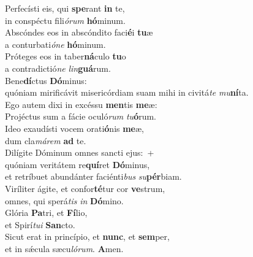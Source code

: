 \evenverse Perfecísti eis, qui \textbf{spe}rant \textbf{in} te,~\*\\
\evenverse in conspéctu fili\textit{ó}\textit{rum} \textbf{hó}minum.\\
\oddverse Abscóndes eos in abscóndito faci\textbf{é}i \textbf{tu}æ~\*\\
\oddverse a conturbati\textit{ó}\textit{ne} \textbf{hó}minum.\\
\evenverse Próteges eos in taber\textbf{ná}culo \textbf{tu}o~\*\\
\evenverse a contradictió\textit{ne} \textit{lin}\textbf{guá}rum.\\
\oddverse Bene\textbf{dí}ctus \textbf{Dó}minus:~\*\\
\oddverse quóniam mirificávit misericórdiam suam mihi in civitá\textit{te} \textit{mu}\textbf{ní}ta.\\
\evenverse Ego autem dixi in excéssu \textbf{men}tis \textbf{me}æ:~\*\\
\evenverse Projéctus sum a fácie oculó\textit{rum} \textit{tu}\textbf{ó}rum.\\
\oddverse Ideo exaudísti vocem orati\textbf{ó}nis \textbf{me}æ,~\*\\
\oddverse dum cla\textit{má}\textit{rem} \textbf{ad} te.\\
\evenverse Dilígite Dóminum omnes sancti ejus:~+\\
\evenverse  quóniam veritátem re\textbf{quí}ret \textbf{Dó}minus,~\*\\
\evenverse et retríbuet abundánter faciénti\textit{bus} \textit{su}\textbf{pér}biam.\\
\oddverse Viríliter ágite, et confor\textbf{té}tur cor \textbf{ve}strum,~\*\\
\oddverse omnes, qui sperá\textit{tis} \textit{in} \textbf{Dó}mino.\\
\evenverse Glória \textbf{Pa}tri, et \textbf{Fí}lio,~\*\\
\evenverse et Spirí\textit{tu}\textit{i} \textbf{San}cto.\\
\oddverse Sicut erat in princípio, et \textbf{nunc}, et \textbf{sem}per,~\*\\
\oddverse et in sǽcula sæcu\textit{ló}\textit{rum}. \textbf{A}men.\\
